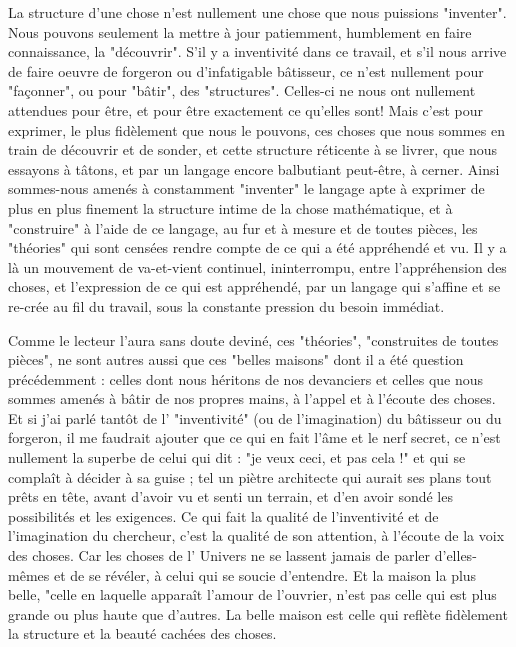 La structure d'une chose n'est nullement une chose que nous puissions "inventer". Nous pouvons seulement la mettre à jour patiemment, humblement en faire connaissance, la "découvrir". S'il y a inventivité dans ce travail, et s'il nous arrive de faire oeuvre de forgeron ou d'infatigable bâtisseur, ce n'est nullement pour "façonner", ou pour "bâtir", des "structures". Celles-ci ne nous ont nullement attendues pour être, et pour être exactement ce qu'elles sont! Mais c'est pour exprimer, le plus fidèlement que nous le pouvons, ces choses que nous sommes en train de découvrir et de sonder, et cette structure réticente à se livrer, que nous essayons à tâtons, et par un langage encore balbutiant peut-être, à cerner. Ainsi sommes-nous amenés à constamment "inventer" le langage apte à exprimer de plus en plus finement la structure intime de la chose mathématique, et à "construire" à l'aide de ce langage, au fur et à mesure et de toutes pièces, les "théories" qui sont censées rendre compte de ce qui a été appréhendé et vu. Il y a là un mouvement de va-et-vient continuel, ininterrompu, entre l'appréhension des choses, et l'expression de ce qui est appréhendé, par un langage qui s'affine et se re-crée au fil du travail, sous la constante pression du besoin immédiat.

Comme le lecteur l'aura sans doute deviné, ces "théories", "construites de toutes pièces", ne sont autres aussi que ces "belles maisons" dont il a été question précédemment : celles dont nous héritons de nos devanciers et celles que nous sommes amenés à bâtir de nos propres mains, à l'appel et à l'écoute des choses. Et si j'ai parlé tantôt de l' "inventivité" (ou de l'imagination) du bâtisseur ou du forgeron, il me faudrait ajouter que ce qui en fait l'âme et le nerf secret, ce n'est nullement la superbe de celui qui dit : "je veux ceci, et pas cela !" et qui se complaît à décider à sa guise ; tel un piètre architecte qui aurait ses plans tout prêts en tête, avant d'avoir vu et senti un terrain, et d'en avoir sondé les possibilités et les exigences. Ce qui fait la qualité de l'inventivité et de l'imagination du chercheur, c'est la qualité de son attention, à l'écoute de la voix des choses. Car les choses de l' Univers ne se lassent jamais de parler d'elles-mêmes et de se révéler, à celui qui se soucie d'entendre. Et la maison la plus belle, "celle en laquelle apparaît l'amour de l'ouvrier, n'est pas celle qui est plus grande ou plus haute que d'autres. La belle maison est celle qui reflète fidèlement la structure et la beauté cachées des choses.


